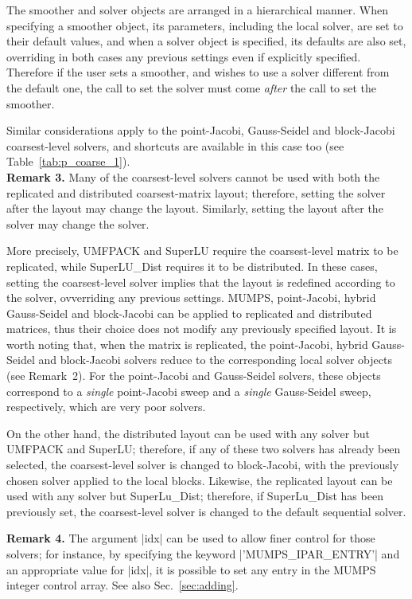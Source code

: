The smoother and solver objects are arranged in a
hierarchical manner. When specifying a smoother object, its parameters,
including the local solver, are set to their default values, and when a solver
object is specified, its defaults are also set, overriding in both
cases any previous settings even if explicitly specified. Therefore if
the user sets a smoother, and wishes to use a solver
different from  the default one, the call to set the solver must come
\emph{after} the call to set the smoother.

Similar considerations apply to the point-Jacobi, Gauss-Seidel and block-Jacobi
coarsest-level solvers, and shortcuts are available
in this case too (see Table~\ref{tab:p_coarse_1}). \\

\textbf{Remark 3.} Many of the coarsest-level solvers cannot be used
with both the replicated and distributed coarsest-matrix layout; 
therefore, setting the solver after the layout may change the layout.
Similarly, setting the layout after the solver may change the solver.

More precisely, UMFPACK and SuperLU require the coarsest-level
matrix to be replicated, while SuperLU\_Dist requires it to be distributed.
In these cases, setting the coarsest-level solver implies that
the layout is redefined according to the solver, ovverriding any
previous settings. MUMPS,  point-Jacobi,
hybrid Gauss-Seidel and block-Jacobi can be applied to
replicated and distributed matrices, thus their choice
does not modify any previously specified layout.
It is worth noting that, when the matrix is replicated,
the point-Jacobi, hybrid Gauss-Seidel and block-Jacobi solvers
reduce to the corresponding local solver objects (see Remark~2).
For the point-Jacobi and Gauss-Seidel solvers, these objects
correspond to a \emph{single} point-Jacobi sweep and a \emph{single}
Gauss-Seidel sweep, respectively, which are very poor solvers.

On the other hand, the distributed layout can be used with any solver
but UMFPACK and SuperLU; therefore, if any of these two solvers has already
been selected, the coarsest-level solver is changed to block-Jacobi,
with the previously chosen solver applied to the local blocks.
Likewise, the replicated layout can be used with any solver but SuperLu\_Dist;
therefore, if SuperLu\_Dist has been previously set, the coarsest-level
solver is changed to the default sequential solver.

\textbf{Remark 4.}  The argument \fortinline|idx| can be used to allow finer
control for those solvers; for instance, by specifying the keyword
\fortinline|'MUMPS_IPAR_ENTRY'| and an appropriate value for \fortinline|idx|, it is
possible to set any entry in the MUMPS integer control array.
See also Sec.~\ref{sec:adding}.


